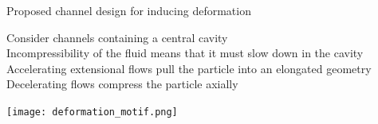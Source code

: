 
\begin{frame}[c]{Proposed channel design for inducing deformation}

	{\scriptsize
		Consider channels containing a central cavity \\
		\vspace{.1in}
		Incompressibility of the fluid means that it must slow down in the cavity \\
		\vspace{.1in}
		Accelerating extensional flows pull the particle into an elongated geometry \\
		\vspace{.1in}
		Decelerating flows compress the particle axially \\
		\vspace{.1in}
	}
	
	
	{\centering
		\texttt{[image: deformation\_motif.png]} \\
		\par
	}
			

\end{frame}



